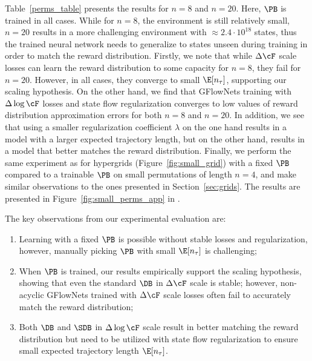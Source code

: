 Table~\ref{perms_table} presents the results for $n=8$ and $n=20$. Here, $\PB$ is trained in all cases. While for $n=8$, the environment is still relatively small, $n=20$ results in a more challenging environment with $\approx 2.4 \cdot 10^{18}$ states, thus the trained neural network needs to generalize to states unseen during training in order to match the reward distribution. Firstly, we note that while $\Delta \cF$ scale losses can learn the reward distribution to some capacity for $n=8$, they fail for $n=20$. However, in all cases, they converge to small $\E[n_\tau]$, supporting our scaling hypothesis. On the other hand, we find that GFlowNets training with $\Delta \log \cF$ losses and state flow regularization converges to low values of reward distribution approximation errors for both $n=8$ and $n=20$. In addition, we see that using a smaller regularization coefficient $\lambda$ on the one hand results in a model with a larger expected trajectory length, but on the other hand, results in a model that better matches the reward distribution.  Finally, we perform the same experiment as for hypergrids (Figure~\ref{fig:small_grid}) with a fixed $\PB$ compared to a trainable $\PB$ on small permutations of length $n=4$, and make similar observations to the ones presented in Section~\ref{sec:grids}. The results are presented in Figure~\ref{fig:small_perms_app} in . 

The key observations from our experimental evaluation are: 
\begin{tcolorbox}[colback=colorblue,
    colframe=black,
    arc=4pt,
    boxsep=0.3pt,
]%
    \begin{enumerate}[itemsep=-2pt,leftmargin=5pt]
        \item Learning with a fixed $\PB$ is possible without stable losses and regularization, however, manually picking $\PB$ with small $\E[n_\tau]$ is challenging;
        \item When $\PB$ is trained, our results empirically support the scaling hypothesis, showing that even the standard $\DB$ in $\Delta \cF$ scale is stable; however, non-acyclic GFlowNets trained with $\Delta \cF$ scale losses often fail to accurately match the reward distribution; 
        \item Both $\DB$ and $\SDB$ in $\Delta \log \cF$ scale result in better matching the reward distribution but need to be utilized with state flow regularization to ensure small expected trajectory length $\E[n_\tau]$.
    \end{enumerate}
\end{tcolorbox}


